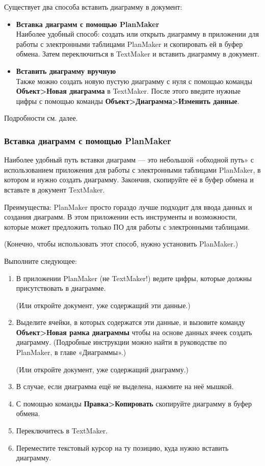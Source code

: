 \documentclass[a4paper,10pt]{article}
\begin{document}
Существует два способа вставить диаграмму в документ:

\begin{itemize}
 \item \textbf{Вставка диаграмм с помощью PlanMaker}\\
 Наиболее удобный способ: создать или открыть диаграмму в приложении для работы с электронными таблицами PlanMaker и скопировать ей в буфер обмена. Затем переключиться в TextMaker и вставить диаграмму в документ.
 \item \textbf{Вставить диаграмму вручную}\\
 Также можно создать новую пустую диаграмму с нуля с помощью команды \textbf{Объект>Новая диаграмма} в TextMaker. После этого введите нужные цифры с помощью команды \textbf{Объект>Диаграмма>Изменить данные}.
\end{itemize}

Подробности см. далее.

\subsubsection{Вставка диаграмм с помощью PlanMaker}
Наиболее удобный путь вставки диаграмм --- это небольшой «обходной путь» с использованием приложения для работы с электронными таблицами PlanMaker, в котором и нужно создать диаграмму. Закончив, скопируйте её в буфер обмена и вставьте в документ TextMaker.

Преимущества: PlanMaker просто гораздо лучше подходит для ввода данных и создания диаграмм. В этом приложении есть инструменты и возможности, которые может предложить только ПО для работы с электронными таблицами.

(Конечно, чтобы использовать этот способ, нужно установить PlanMaker.)

Выполните следующее:
\begin{enumerate}
 \item В приложении PlanMaker (не TextMaker!) ведите цифры, которые должны присутствовать в диаграмме.
 
 (Или откройте документ, уже содержащий эти данные.)
 \item Выделите ячейки, в которых содержатся эти данные, и вызовите команду \textbf{Объект>Новая рамка диаграммы} чтобы на основе данных ячеек создать диаграмму. (Подробные инструкции можно найти в руководстве по PlanMaker, в главе «Диаграммы».)
 
 (Или откройте документ, уже содержащий диаграмму.)
 \item В случае, если диаграмма ещё не выделена, нажмите на неё мышкой.
 \item С помощью команды \textbf{Правка>Копировать} скопируйте диаграмму в буфер обмена.
 \item Переключитесь в TextMaker.
 \item Переместите текстовый курсор на ту позицию, куда нужно вставить диаграмму.
\end{enumerate}
\end{document}
